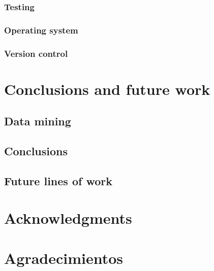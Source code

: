 \documentclass{DeustoFDP}
\begin{document}
\subsection{Testing}
\subsection{Operating system}
\subsection{Version control}

\chapter{Conclusions and future work}
\section{Data mining}
\section{Conclusions}
\section{Future lines of work}

\chapter{Acknowledgments}

\chapter{Agradecimientos}

\printbibliography[heading=bibintoc]

\appendix

\backmatter
\end{document}
